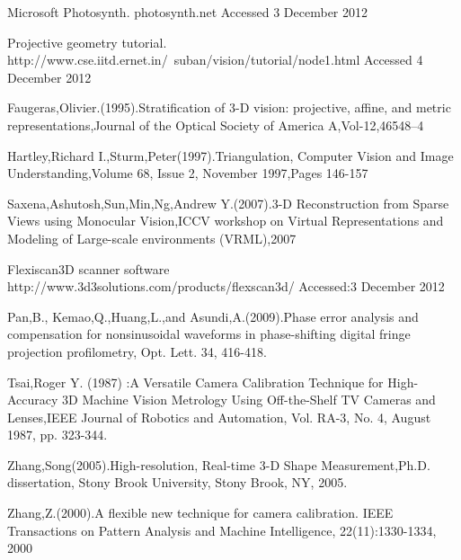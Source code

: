 \begin{singlespace}
\begin{thebibliography}{10000000000}
Microsoft Photosynth.\newline 
photosynth.net\newline
Accessed 3 December 2012

Projective geometry tutorial.\newline 
http://www.cse.iitd.ernet.in/~suban/vision/tutorial/node1.html \newline
Accessed 4 December 2012

Faugeras,Olivier.(1995).Stratification of 3-D vision: projective, affine, and metric representations,Journal of the Optical Society of America A,Vol-12,46548--4 


Hartley,Richard I.,Sturm,Peter(1997).Triangulation, 
Computer Vision and Image Understanding,Volume 68, Issue 2, November 1997,Pages 146-157 

Saxena,Ashutosh,Sun,Min,Ng,Andrew Y.(2007).3-D Reconstruction from Sparse Views using Monocular Vision,ICCV workshop on Virtual Representations and Modeling of Large-scale environments (VRML),2007  

Flexiscan3D scanner software \newline
http://www.3d3solutions.com/products/flexscan3d/ \newline
Accessed:3 December 2012

Pan,B., Kemao,Q.,Huang,L.,and Asundi,A.(2009).Phase error analysis and compensation for nonsinusoidal waveforms in phase-shifting digital fringe projection profilometry, Opt. Lett.  34, 416-418. 

Tsai,Roger Y. (1987) :A Versatile Camera Calibration Technique for High- 
Accuracy 3D Machine Vision Metrology Using Off-the-Shelf TV Cameras 
and Lenses,IEEE Journal of Robotics and Automation, Vol. RA-3, No. 4, 
August 1987, pp. 323-344. 

Zhang,Song(2005).High-resolution, Real-time 3-D Shape Measurement,Ph.D. dissertation, Stony Brook University, Stony Brook, NY, 2005. 

Zhang,Z.(2000).A flexible new technique for camera calibration. IEEE Transactions on Pattern Analysis and Machine Intelligence, 22(11):1330-1334, 2000 


\end{thebibliography}
\end{singlespace}
